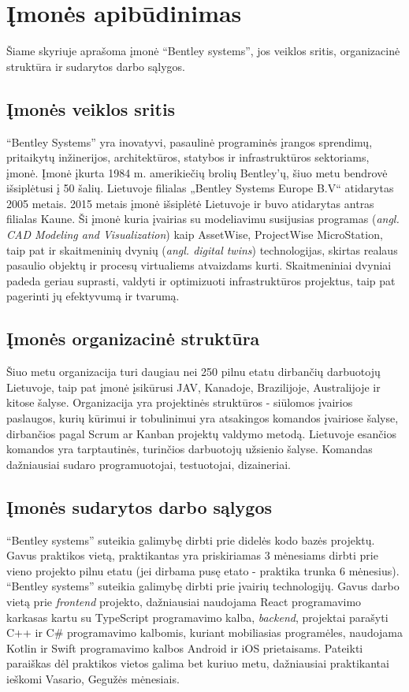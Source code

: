 
\section{Įmonės apibūdinimas}
Šiame skyriuje aprašoma įmonė \enquote{Bentley systems}, jos veiklos sritis, organizacinė struktūra ir sudarytos darbo sąlygos.
\subsection{Įmonės veiklos sritis}


\enquote{Bentley Systems} yra inovatyvi, pasaulinė programinės įrangos sprendimų, pritaikytų inžinerijos, architektūros, statybos ir infrastruktūros sektoriams, įmonė. Įmonė įkurta 1984 m. amerikiečių brolių Bentley'ų, šiuo metu bendrovė išsiplėtusi į 50 šalių. Lietuvoje filialas „Bentley Systems Europe B.V“ atidarytas 2005 metais. 2015 metais įmonė išsiplėtė Lietuvoje ir buvo atidarytas antras filialas Kaune. Ši įmonė kuria įvairias su modeliavimu susijusias programas (\emph{angl. CAD Modeling and Visualization}) kaip AssetWise, ProjectWise MicroStation, taip pat ir skaitmeninių dvynių (\emph{angl. digital twins}) technologijas, skirtas realaus pasaulio objektų ir procesų virtualiems atvaizdams kurti. Skaitmeniniai dvyniai padeda geriau suprasti, valdyti ir optimizuoti infrastruktūros projektus, taip pat pagerinti jų efektyvumą ir tvarumą.

\subsection{Įmonės organizacinė struktūra}
Šiuo metu organizacija turi daugiau nei 250 pilnu etatu dirbančių darbuotojų Lietuvoje, taip pat įmonė įsikūrusi JAV, Kanadoje, Brazilijoje, Australijoje ir kitose šalyse. Organizacija yra projektinės struktūros - siūlomos įvairios paslaugos, kurių kūrimui ir tobulinimui yra atsakingos komandos įvairiose šalyse, dirbančios pagal Scrum ar Kanban projektų valdymo metodą. Lietuvoje esančios komandos yra tarptautinės, turinčios darbuotojų užsienio šalyse. Komandas dažniausiai sudaro programuotojai, testuotojai, dizaineriai.

\subsection{Įmonės sudarytos darbo sąlygos}
\enquote{Bentley systems} suteikia galimybę dirbti prie didelės kodo bazės projektų. Gavus praktikos vietą, praktikantas yra priskiriamas 3 mėnesiams dirbti prie vieno projekto pilnu etatu (jei dirbama pusę etato - praktika trunka 6 mėnesius). \enquote{Bentley systems} suteikia galimybę dirbti prie įvairių technologijų. Gavus darbo vietą prie \textit{frontend} projekto, dažniausiai naudojama React programavimo karkasas kartu su TypeScript programavimo kalba, \textit{backend}, projektai parašyti C++ ir C\# programavimo kalbomis, kuriant mobiliasias programėles, naudojama Kotlin ir Swift programavimo kalbos Android ir iOS prietaisams. Pateikti paraiškas dėl praktikos vietos galima bet kuriuo metu, dažniausiai praktikantai ieškomi Vasario, Gegužės mėnesiais.

